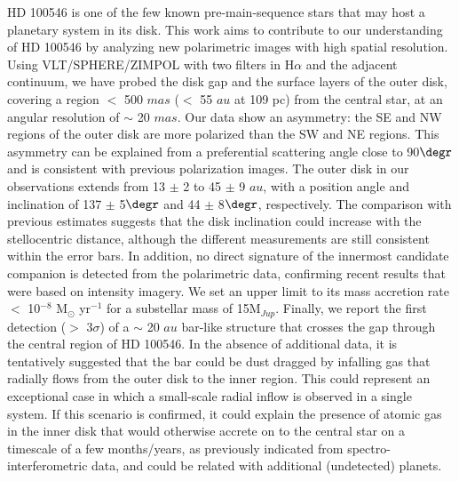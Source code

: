 \documentclass{aa}
\begin{document}
  \abstract
   {HD 100546 is one of the few known pre-main-sequence stars that may host a planetary system in its disk.}
   {This work aims to contribute to our understanding of HD 100546 by analyzing new polarimetric images with high spatial resolution.}
   {Using VLT/SPHERE/ZIMPOL with two filters in H$\alpha$ and the adjacent continuum, we have probed the disk gap and the surface layers of the outer disk, covering a region $<$ 500 $mas$ ($<$ 55 $au$ at 109 pc) from the central star, at an angular resolution of $\sim$ 20 $mas$.}
   {Our data show an asymmetry: the SE and NW regions of the outer disk are more polarized than the SW and NE regions. This asymmetry can be explained from a preferential scattering angle close to 90$\degr$ and is consistent with previous polarization images. The outer disk in our observations extends from 13 $\pm$ 2 to 45 $\pm$ 9 $au$, with a position angle and inclination of 137 $\pm$ 5$\degr$ and 44 $\pm$ 8$\degr$, respectively. The comparison with previous estimates suggests that the disk inclination could increase with the stellocentric distance, although the different measurements are still consistent within the error bars. In addition, no direct signature of the innermost candidate companion is detected from the polarimetric data, confirming recent results that were based on intensity imagery. We set an upper limit to its mass accretion rate $<$ 10$^{-8}$ M$_{\odot}$ yr$^{-1}$ for a substellar mass of 15M$_{Jup}$. Finally, we report the first detection ($>$ 3$\sigma$) of a $\sim$ 20 $au$ bar-like structure that crosses the gap through the central region of HD 100546.}
   {In the absence of additional data, it is tentatively suggested that the bar could be dust dragged by infalling gas that radially flows from the outer disk to the inner region. This could represent an exceptional case in which a small-scale radial inflow is observed in a single system. If this scenario is confirmed, it could explain the presence of atomic gas in the inner disk that would otherwise accrete on to the central star on a timescale of a few months/years, as previously indicated from spectro-interferometric data, and could be related with additional (undetected) planets.}

   \maketitle
%
\end{document}
